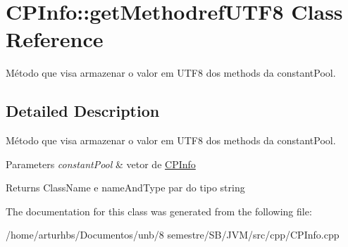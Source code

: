 \hypertarget{classCPInfo_1_1getMethodrefUTF8}{}\section{C\+P\+Info\+:\+:get\+Methodref\+U\+T\+F8 Class Reference}
\label{classCPInfo_1_1getMethodrefUTF8}


Método que visa armazenar o valor em U\+T\+F8 dos methods da constant\+Pool.  




\subsection{Detailed Description}
Método que visa armazenar o valor em U\+T\+F8 dos methods da constant\+Pool. 


\begin{DoxyParams}{Parameters}
{\em constant\+Pool} & vetor de \hyperlink{classCPInfo}{C\+P\+Info} \\
\hline
\end{DoxyParams}
\begin{DoxyReturn}{Returns}
Class\+Name e name\+And\+Type par do tipo string 
\end{DoxyReturn}


The documentation for this class was generated from the following file\+:\begin{DoxyCompactItemize}
\item 
/home/arturhbs/\+Documentos/unb/8 semestre/\+S\+B/\+J\+V\+M/src/cpp/C\+P\+Info.\+cpp\end{DoxyCompactItemize}

